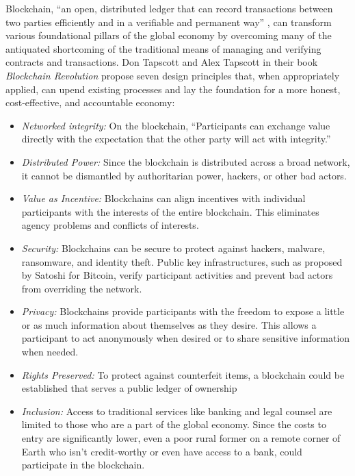 \documentclass[sigconf]{acmart}
\begin{document}
Blockchain, ``an open, distributed ledger that can record transactions between two parties efficiently and in a verifiable and permanent way'' \cite{hbr}, can transform various foundational pillars of the global economy by overcoming many of the antiquated shortcoming of the traditional means of managing and verifying contracts and transactions. Don Tapscott and Alex Tapscott \cite{tapscott} in their book \textit{Blockchain Revolution} propose seven design principles that, when appropriately applied, can upend existing processes and lay the foundation for a more honest, cost-effective, and accountable economy:

\begin{itemize}
\item \textit{Networked integrity:} On the blockchain, ``Participants can exchange value directly with the expectation that the other party will act with integrity.'' 
\item \textit{Distributed Power:} Since the blockchain is distributed across a broad network, it cannot be dismantled by authoritarian power, hackers, or other bad actors.
\item \textit{Value as Incentive:} Blockchains can align incentives with individual participants with the interests of the entire blockchain. This eliminates agency problems and conflicts of interests.
\item \textit{Security:} Blockchains can be secure to protect against hackers, malware, ransomware, and identity theft. Public key infrastructures, such as proposed by Satoshi for Bitcoin, verify participant activities and prevent bad actors from overriding the network. 
\item \textit{Privacy:} Blockchains provide participants with the freedom to expose a little or as much information about themselves as they desire. This allows a participant to act anonymously when desired or to share sensitive information when needed.
\item \textit{Rights Preserved:} To protect against counterfeit items, a blockchain could be established that serves a public ledger of ownership
\item \textit{Inclusion:} Access to traditional services like banking and legal counsel are limited to those who are a part of the global economy. Since the costs to entry are significantly lower, even a poor rural former on a remote corner of Earth who isn’t credit-worthy or even have access to a bank, could participate in the blockchain.
\end{itemize}
\end{document}
